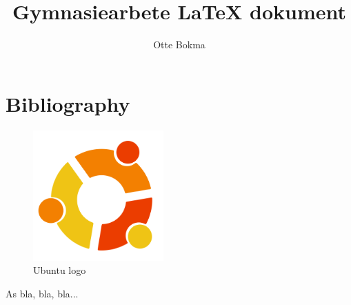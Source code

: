 \documentclass[11pt]{article}
\title{Gymnasiearbete {\LaTeX} dokument}
\author{Otte Bokma}
\begin{document}
\maketitle

\section{Bibliography}

\begin{figure}[h]
  \centering
  \includegraphics[width=5cm]{graphics/ubuntu.png}
  \caption{Ubuntu logo}
\end{figure}


As \cite{noauthor_feature_2020} bla, bla, bla...\\

\printbibliography
\end{document}
